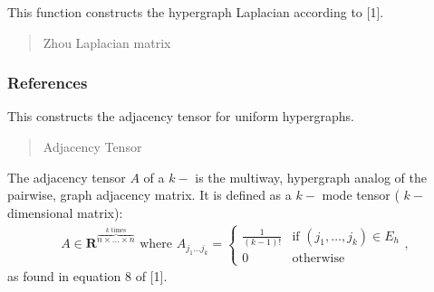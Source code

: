 \documentclass[letterpaper,10pt,english]{sphinxmanual}
\begin{document}
\begin{fulllineitems}
\begin{fulllineitems}
\end{fulllineitems}


\begin{fulllineitems}
\label{\detokenize{HAT:HAT.Hypergraph.Hypergraph.zhouLaplacian}}
\pysigstartsignatures
{}
\pysigstopsignatures
\sphinxAtStartPar
This function constructs the hypergraph Laplacian according to {[}1{]}.
\begin{quote}\begin{description}
\sphinxAtStartPar
Zhou Laplacian matrix

\sphinxAtStartPar
{}

\end{description}\end{quote}
\subsubsection*{References}

\end{fulllineitems}


\begin{fulllineitems}
\label{\detokenize{HAT:HAT.Hypergraph.Hypergraph.adjTensor}}
\pysigstartsignatures
{}
\pysigstopsignatures
\sphinxAtStartPar
This constructs the adjacency tensor for uniform hypergraphs.
\begin{quote}\begin{description}
\sphinxAtStartPar
Adjacency Tensor

\sphinxAtStartPar
{}

\end{description}\end{quote}

\sphinxAtStartPar
The adjacency tensor \(A\) of a \(k-\) is the multi\sphinxhyphen{}way, hypergraph analog of the pairwise, graph
adjacency matrix. It is defined as a \(k-\) mode tensor ( \(k-\) dimensional matrix):
\begin{equation*}
\begin{split}A \in \mathbf{R}^{ \overbrace{n \times \dots \times n}^{k \text{ times}}} \text{ where }{A}_{j_1\dots j_k} = \begin{cases} \frac{1}{(k-1)!} & \text{if }(j_1,\dots,j_k)\in {E}_h \\ 0 & \text{otherwise} \end{cases},\end{split}
\end{equation*}
\sphinxAtStartPar
as found in equation 8 of {[}1{]}.

\end{fulllineitems}
\end{fulllineitems}
\end{document}
